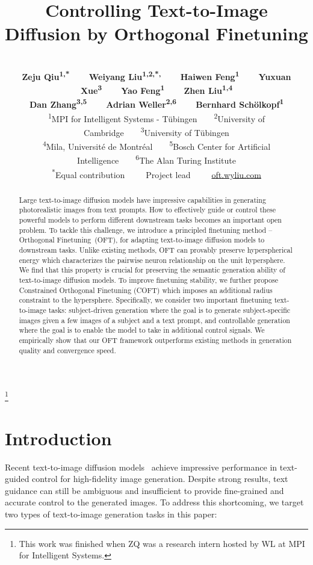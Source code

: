 \documentclass{article}
\title{\fontsize{14.5pt}{\baselineskip}\selectfont Controlling Text-to-Image Diffusion by Orthogonal Finetuning}
\author{%
  \vspace{-5mm}\\
  \textbf{\small Zeju Qiu\textsuperscript{1,*}~~~~Weiyang Liu\textsuperscript{1,2,*,\textdagger}~~~~Haiwen Feng\textsuperscript{1}~~~~Yuxuan Xue\textsuperscript{3}~~~~Yao Feng\textsuperscript{1}~~~~Zhen Liu\textsuperscript{1,4}}\\
  \textbf{\small Dan Zhang\textsuperscript{3,5}~~~~Adrian Weller\textsuperscript{2,6}~~~~Bernhard Sch\"olkopf\textsuperscript{1}}\\[0.5mm]
  \small \textsuperscript{1}MPI for Intelligent Systems - T\"ubingen~~~~\textsuperscript{2}University of Cambridge~~~~\textsuperscript{3}University of T\"ubingen\\
  \small \textsuperscript{4}Mila, Universit\'e de Montr\'eal~~~~\textsuperscript{5}Bosch Center for Artificial Intelligence~~~~\textsuperscript{6}The Alan Turing Institute\\
  \small \textsuperscript{*}Equal contribution~~~~~\textsuperscript{\textdagger}Project lead~~~~~\href{https://oft.wyliu.com}{\url{oft.wyliu.com}}
}
\newcommand\blfootnote[1]{%
  \begingroup
  \renewcommand\thefootnote{}\footnote{#1}%
  \addtocounter{footnote}{-1}%
  \endgroup
}
\begin{document}
\doparttoc
\faketableofcontents

\maketitle

\blfootnote{This work was finished when ZQ was a research intern hosted by WL at MPI for Intelligent Systems.}
\vspace{-8.5mm}
\begin{abstract}
\vspace{-0.5mm}
Large text-to-image diffusion models have impressive capabilities in generating photorealistic images from text prompts. How to effectively guide or control these powerful models to perform different downstream tasks becomes an important open problem. To tackle this challenge, we introduce a principled finetuning method -- Orthogonal Finetuning~(OFT), for adapting text-to-image diffusion models to downstream tasks. Unlike existing methods, OFT can provably preserve hyperspherical energy which characterizes the pairwise neuron relationship on the unit hypersphere. We find that this property is crucial for preserving the semantic generation ability of text-to-image diffusion models. To improve finetuning stability, we further propose Constrained Orthogonal Finetuning (COFT) which imposes an additional radius constraint to the hypersphere. Specifically, we consider two important finetuning text-to-image tasks: subject-driven generation where the goal is to generate subject-specific images given a few images of a subject and a text prompt, and controllable generation where the goal is to enable the model to take in additional control signals. We empirically show that our OFT framework outperforms existing methods in generation quality and convergence speed.

\end{abstract}


\vspace{-1.25mm}

\section{Introduction}
\vspace{-1mm}

Recent text-to-image diffusion models~\cite{saharia2022photorealistic,ramesh2022hierarchical,rombach2022high} achieve impressive performance in text-guided control for high-fidelity image generation. Despite strong results, text guidance can still be ambiguous and insufficient to provide fine-grained and accurate control to the generated images. To address this shortcoming, we target two types of text-to-image generation tasks in this paper:
\end{document}
